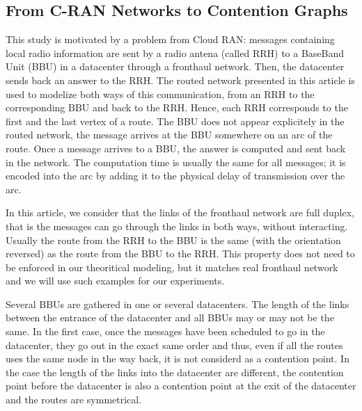 \documentclass[english]{article}
\begin{document}
  \subsection{From C-RAN Networks to Contention Graphs}
  \label{subsection:CRANGRAPH}

  This study is motivated by a problem from Cloud RAN: messages containing local radio information are sent by a radio antena (called RRH) to a BaseBand Unit (BBU) in a datacenter through a fronthaul network. Then, the datacenter sends back an answer to the RRH. The routed network presented in this article is used to modelize both ways of this communication, from an RRH to the corresponding BBU and back to the RRH. Hence, each RRH corresponds to the first and the last vertex of a route. The BBU does not appear explicitely in the routed network, the message arrives at the BBU somewhere on an arc of the route. Once a message arrives to a BBU, the answer is computed and sent back in the network. The computation time is usually the same for all messages; it is encoded into the arc by adding it to the physical delay of transmission over the arc.
  
  In this article, we consider that the links of the fronthaul network are full duplex, that is the messages can go through the links in both ways, without interacting. Usually the route from the RRH to the BBU is the same (with the orientation reversed) as the route from the BBU to the RRH. This property does not need to be enforced in our theoritical modeling, but it matches real fronthaul network and we will use such examples for our experiments. 

  
    Several BBUs are gathered in one or several datacenters. The length of the links between the entrance of the datacenter and all BBUs may or may not be the same. In the first case, once the messages have been scheduled to go in the datacenter, they go out in the exact same order and thus, even if all the routes uses the same node in the way back, it is not considerd as a contention point. In the case the length of the links into the datacenter are different, the contention point before the datacenter is also a contention point at the exit of the datacenter and the routes are symmetrical.



\end{document}
